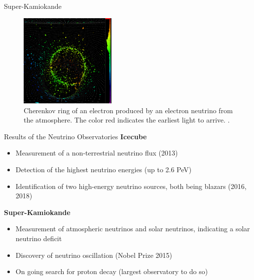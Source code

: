 \documentclass[aspectratio=1610, 10pt]{beamer}
\begin{document}
\begin{frame}{Super-Kamiokande}
  \begin{figure}
    \includegraphics[width=0.42\textwidth]{images/kamio_ring.png}
    \caption{Cherenkov ring of an electron produced by an electron neutrino from the atmosphere. The
    color red indicates the earliest light to arrive. \cite{kamio_ring}.}
  \end{figure}
\end{frame}



\begin{frame}{Results of the Neutrino Observatories}
\textbf{Icecube}
 \begin{itemize}
   \item Measurement of a non-terrestrial neutrino flux (2013)
   \medskip
   \item Detection of the highest neutrino energies (up to 2.6 PeV)
   \medskip
   \item Identification of two high-energy neutrino sources, both being blazars (2016, 2018)
 \end{itemize}
\vspace{0.5cm}
\textbf{Super-Kamiokande}
  \begin{itemize}
    \item Measurement of atmospheric neutrinos and solar neutrinos, indicating a solar neutrino deficit
    \medskip
    \item Discovery of neutrino oscillation (Nobel Prize 2015)
    \medskip
    \item On going search for proton decay (largest observatory to do so)
  \end{itemize}
\end{frame}
\end{document}
